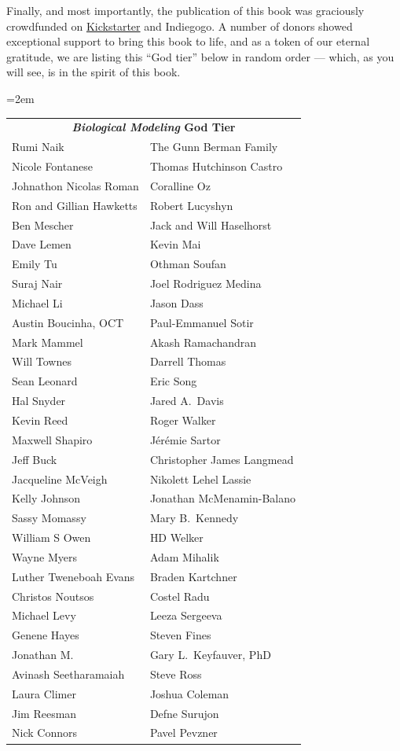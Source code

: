 Finally, and most importantly, the publication of this book was graciously crowdfunded on \href{https://www.kickstarter.com/projects/phillipcompeau/biological-modeling-a-short-tour?ref=user_menu}{Kickstarter} and Indiegogo. A number of donors showed exceptional support to bring this book to life, and as a token of our eternal gratitude, we are listing this ``God tier'' below in random order --- which, as you will see, is in the spirit of this book.
\begin{center}
\tabcolsep=2em
\begin{tabular}{l l}
\multicolumn{2}{c}{\textbf{\textit{Biological Modeling} God Tier}}\\[4ex]
Rumi Naik & The Gunn Berman Family\\
Nicole Fontanese & Thomas Hutchinson Castro\\
Johnathon Nicolas Roman & Coralline Oz\\
Ron and Gillian Hawketts & Robert Lucyshyn\\
Ben Mescher & Jack and Will Haselhorst\\
Dave Lemen & Kevin Mai\\
Emily Tu & Othman Soufan\\
Suraj Nair & Joel Rodriguez Medina\\
Michael Li & Jason Dass\\
Austin Boucinha, OCT & Paul-Emmanuel Sotir\\
Mark Mammel & Akash Ramachandran\\
Will Townes & Darrell Thomas\\
Sean Leonard & Eric Song\\
Hal Snyder & Jared A.~Davis\\
Kevin Reed & Roger Walker\\
Maxwell Shapiro & Jérémie Sartor\\
Jeff Buck & Christopher James Langmead\\
Jacqueline McVeigh & Nikolett Lehel Lassie\\
Kelly Johnson & Jonathan McMenamin-Balano\\
Sassy Momassy & Mary B.~Kennedy\\
William S Owen & HD Welker\\
Wayne Myers & Adam Mihalik\\
Luther Tweneboah Evans & Braden Kartchner\\
Christos Noutsos & Costel Radu\\
Michael Levy & Leeza Sergeeva\\
Genene Hayes & Steven Fines\\
Jonathan M. & Gary L.~Keyfauver, PhD\\
Avinash Seetharamaiah & Steve Ross\\
Laura Climer & Joshua Coleman\\
Jim Reesman & Defne Surujon\\
Nick Connors & Pavel Pevzner\\
\end{tabular}
\end{center}

%
%

\newpage \phantom{}
\thispagestyle{empty}